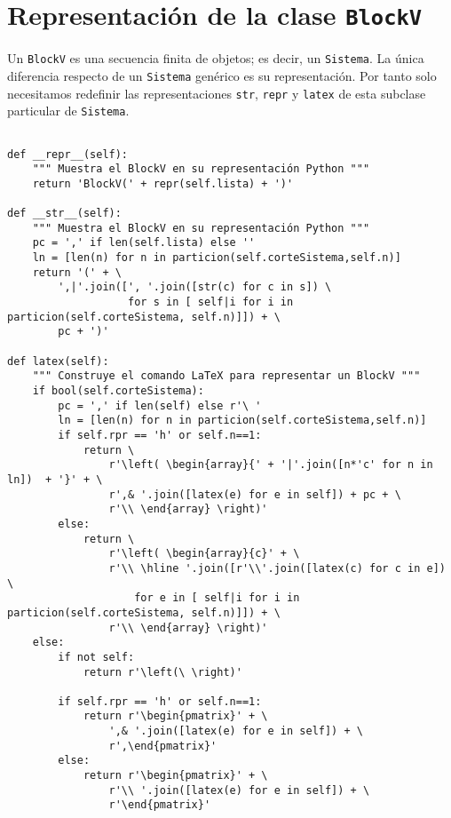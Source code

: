 \documentclass[11pt]{report}
\begin{document}
\section{Representación de la clase \texttt{BlockV}}
\label{sec:orgf71e861}
Un \texttt{BlockV} es una secuencia finita de objetos; es decir, un
\texttt{Sistema}.  La única diferencia respecto de un \texttt{Sistema} genérico es
su representación. Por tanto solo necesitamos redefinir las
representaciones \texttt{str}, \texttt{repr} y \texttt{latex} de esta subclase particular
de \texttt{Sistema}.

\begin{verbatim}

def __repr__(self):
    """ Muestra el BlockV en su representación Python """
    return 'BlockV(' + repr(self.lista) + ')'
                           
def __str__(self):
    """ Muestra el BlockV en su representación Python """
    pc = ',' if len(self.lista) else ''
    ln = [len(n) for n in particion(self.corteSistema,self.n)]
    return '(' + \
        ',|'.join([', '.join([str(c) for c in s]) \
                   for s in [ self|i for i in particion(self.corteSistema, self.n)]]) + \
        pc + ')'

def latex(self):
    """ Construye el comando LaTeX para representar un BlockV """
    if bool(self.corteSistema):
        pc = ',' if len(self) else r'\ '
        ln = [len(n) for n in particion(self.corteSistema,self.n)]
        if self.rpr == 'h' or self.n==1:    
            return \
                r'\left( \begin{array}{' + '|'.join([n*'c' for n in ln])  + '}' + \
                r',& '.join([latex(e) for e in self]) + pc + \
                r'\\ \end{array} \right)'
        else:
            return \
                r'\left( \begin{array}{c}' + \
                r'\\ \hline '.join([r'\\'.join([latex(c) for c in e]) \
                    for e in [ self|i for i in particion(self.corteSistema, self.n)]]) + \
                r'\\ \end{array} \right)'
    else:
        if not self:
            return r'\left(\ \right)'

        if self.rpr == 'h' or self.n==1:
            return r'\begin{pmatrix}' + \
                ',& '.join([latex(e) for e in self]) + \
                r',\end{pmatrix}'
        else:
            return r'\begin{pmatrix}' + \
                r'\\ '.join([latex(e) for e in self]) + \
                r'\end{pmatrix}'

\end{verbatim}
\end{document}
